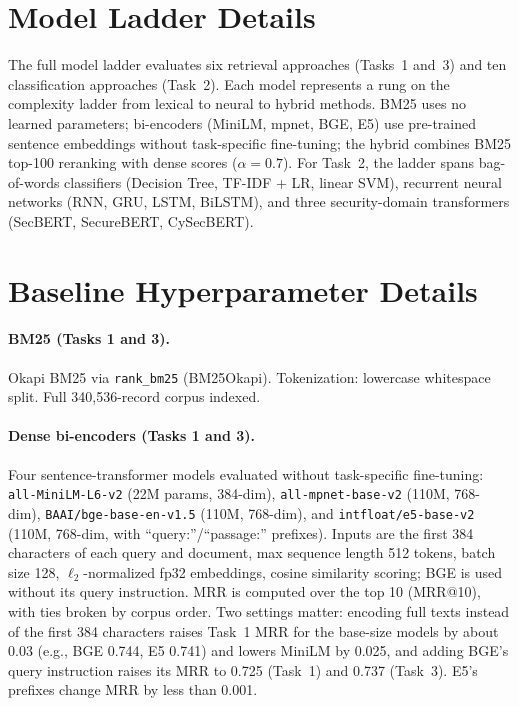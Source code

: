 \documentclass{article}
\begin{document}
\section{Model Ladder Details}
\label{app:model-ladder}

The full model ladder evaluates six retrieval approaches (Tasks~1 and~3) and ten classification approaches (Task~2). Each model represents a rung on the complexity ladder from lexical to neural to hybrid methods. BM25 uses no learned parameters; bi-encoders (MiniLM, mpnet, BGE, E5) use pre-trained sentence embeddings without task-specific fine-tuning; the hybrid combines BM25 top-100 reranking with dense scores ($\alpha{=}0.7$). For Task~2, the ladder spans bag-of-words classifiers (Decision Tree, TF-IDF + LR, linear SVM), recurrent neural networks (RNN, GRU, LSTM, BiLSTM), and three security-domain transformers (SecBERT, SecureBERT, CySecBERT).

\section{Baseline Hyperparameter Details}
\label{app:hyperparams}

\paragraph{BM25 (Tasks 1 and 3).} 
Okapi BM25 via \texttt{rank\_bm25} (BM25Okapi). Tokenization: lowercase whitespace split. Full 340,536-record corpus indexed.

\paragraph{Dense bi-encoders (Tasks 1 and 3).}
Four sentence-transformer models evaluated without task-specific fine-tuning: \texttt{all-MiniLM-L6-v2} (22M params, 384-dim), \texttt{all-mpnet-base-v2} (110M, 768-dim), \texttt{BAAI/bge-base-en-v1.5} (110M, 768-dim), and \texttt{intfloat/e5-base-v2} (110M, 768-dim, with ``query:''/``passage:'' prefixes). Inputs are the first 384 characters of each query and document, max sequence length 512 tokens, batch size 128, $\ell_2$-normalized fp32 embeddings, cosine similarity scoring; BGE is used without its query instruction. MRR is computed over the top 10 (MRR@10), with ties broken by corpus order. Two settings matter: encoding full texts instead of the first 384 characters raises Task~1 MRR for the base-size models by about 0.03 (e.g., BGE 0.744, E5 0.741) and lowers MiniLM by 0.025, and adding BGE's query instruction raises its MRR to 0.725 (Task~1) and 0.737 (Task~3). E5's prefixes change MRR by less than 0.001.
\end{document}
